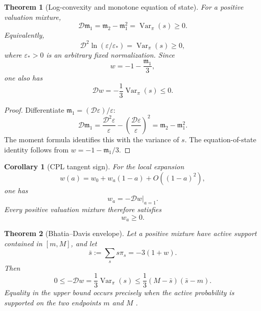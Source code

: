 \documentclass[aps,prd,preprint,onecolumn,nofootinbib,superscriptaddress,showkeys]{revtex4-2}
\numberwithin{equation}{section}
\theoremstyle{definition}
\theoremstyle{plain}
\newtheorem{theorem}{Theorem}[section]
\newtheorem{corollary}{Corollary}[section]
\newcommand{\Dil}{\mathscr D}
\begin{document}
\begin{theorem}[Log-convexity and monotone equation of state]
For a positive valuation mixture,
\begin{equation}
\Dil\mathfrak m_1
=
\mathfrak m_2-\mathfrak m_1^2
=
\operatorname{Var}_\pi(s)\ge0.
\end{equation}
Equivalently,
\begin{equation}
\boxed{
\Dil^2\ln(\varepsilon/\varepsilon_*)=
\operatorname{Var}_\pi(s)\ge0,
}
\end{equation}
where \(\varepsilon_*>0\) is an arbitrary fixed normalization.  Since
\begin{equation}
w=-1-\frac{\mathfrak m_1}{3},
\end{equation}
one also has
\begin{equation}
\boxed{
\Dil w=-\frac13\operatorname{Var}_\pi(s)\le0.
}
\end{equation}
\end{theorem}

\begin{proof}
Differentiate \(\mathfrak m_1=(\Dil\varepsilon)/\varepsilon\):
\[
\Dil\mathfrak m_1
=
\frac{\Dil^2\varepsilon}{\varepsilon}
-
\left(\frac{\Dil\varepsilon}{\varepsilon}\right)^2
=
\mathfrak m_2-\mathfrak m_1^2.
\]
The moment formula identifies this with the variance of \(s\).  The equation-of-state identity follows from \(w=-1-\mathfrak m_1/3\).
\end{proof}

\begin{corollary}[CPL tangent sign]
For the local expansion
\[
w(a)=w_0+w_a(1-a)+O((1-a)^2),
\]
one has
\[
w_a=-\Dil w|_{a=1}.
\]
Every positive valuation mixture therefore satisfies
\begin{equation}
w_a\ge0.
\end{equation}
\end{corollary}

\begin{theorem}[Bhatia--Davis envelope]
Let a positive mixture have active support contained in \([m,M]\), and let
\begin{equation}
\bar s:=\sum_s s\pi_s=-3(1+w).
\end{equation}
Then
\begin{equation}
0\le-\Dil w
=
\frac13\operatorname{Var}_\pi(s)
\le
\frac13(M-\bar s)(\bar s-m).
\end{equation}
Equality in the upper bound occurs precisely when the active probability is supported on the two endpoints \(m\) and \(M\) \cite{BhatiaDavis2000}.
\end{theorem}
\end{document}
